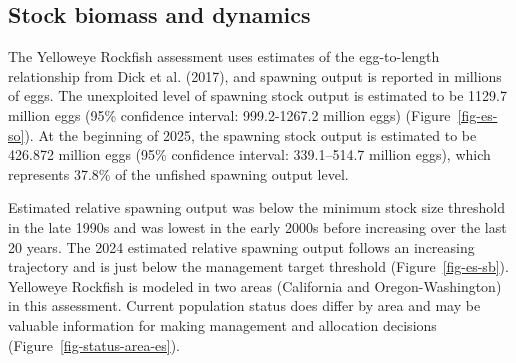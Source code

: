 \documentclass[
]{scrartcl}
\begin{document}
\subsection*{Stock biomass and
dynamics}\label{stock-biomass-and-dynamics}

The Yelloweye Rockfish assessment uses estimates of the egg-to-length
relationship from Dick et al. (2017), and spawning output is reported in
millions of eggs. The unexploited level of spawning stock output is
estimated to be 1129.7 million eggs (95\% confidence interval:
999.2-1267.2 million eggs) (Figure~\ref{fig-es-so}). At the beginning of
2025, the spawning stock output is estimated to be 426.872 million eggs
(95\% confidence interval: 339.1--514.7 million eggs), which represents
37.8\% of the unfished spawning output level.

Estimated relative spawning output was below the minimum stock size
threshold in the late 1990s and was lowest in the early 2000s before
increasing over the last 20 years. The 2024 estimated relative spawning
output follows an increasing trajectory and is just below the management
target threshold (Figure~\ref{fig-es-sb}). Yelloweye Rockfish is modeled
in two areas (California and Oregon-Washington) in this assessment.
Current population status does differ by area and may be valuable
information for making management and allocation decisions
(Figure~\ref{fig-status-area-es}).

\begingroup
\fontsize{9.0pt}{10.8pt}\selectfont
\end{document}
